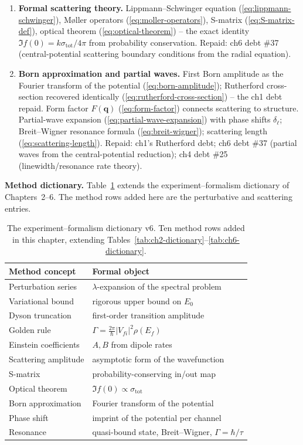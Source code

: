\begin{enumerate}
\item[\S 8.5] \textbf{Formal scattering theory.} Lippmann--Schwinger equation (\eqref{eq:lippmann-schwinger}), M\o{}ller operators (\eqref{eq:moller-operators}), S-matrix (\eqref{eq:S-matrix-def}), optical theorem (\eqref{eq:optical-theorem}) -- the exact identity $\Im f(0) = k\sigma_{\text{tot}}/4\pi$ from probability conservation. Repaid: ch6 debt \#37 (central-potential scattering boundary conditions from the radial equation).

\item[\S 8.6] \textbf{Born approximation and partial waves.} First Born amplitude as the Fourier transform of the potential (\eqref{eq:born-amplitude}); Rutherford cross-section recovered identically (\eqref{eq:rutherford-cross-section}) -- the ch1 debt repaid. Form factor $F(\bm q)$ (\eqref{eq:form-factor}) connects scattering to structure. Partial-wave expansion (\eqref{eq:partial-wave-expansion}) with phase shifts $\delta_{\ell}$; Breit--Wigner resonance formula (\eqref{eq:breit-wigner}); scattering length (\eqref{eq:scattering-length}). Repaid: ch1's Rutherford debt; ch6 debt \#37 (partial waves from the central-potential reduction); ch4 debt \#25 (linewidth/resonance rate theory).
\end{enumerate}

\medskip\noindent\textbf{Method dictionary.}
Table~\ref{tab:ch8-dictionary} extends the experiment--formalism dictionary of Chapters~2--6. The method rows added here are the perturbative and scattering entries.

\begin{table}[htbp]
\centering
\caption{The experiment--formalism dictionary v6. Ten method rows added in this chapter, extending Tables~\ref{tab:ch2-dictionary}--\ref{tab:ch6-dictionary}.}
\label{tab:ch8-dictionary}
\begin{tabular}{@{}ll@{}}
\toprule
Method concept & Formal object \\
\midrule
Perturbation series & $\lambda$-expansion of the spectral problem \\
Variational bound & rigorous upper bound on $E_{0}$ \\
Dyson truncation & first-order transition amplitude \\
Golden rule & $\Gamma = \frac{2\pi}{\hbar}|V_{fi}|^{2}\rho(E_{f})$ \\
Einstein coefficients & $A,B$ from dipole rates \\
Scattering amplitude & asymptotic form of the wavefunction \\
S-matrix & probability-conserving in/out map \\
Optical theorem & $\Im f(0) \propto \sigma_{\text{tot}}$ \\
Born approximation & Fourier transform of the potential \\
Phase shift & imprint of the potential per channel \\
Resonance & quasi-bound state, Breit--Wigner, $\Gamma = \hbar/\tau$ \\
\bottomrule
\end{tabular}
\end{table}

